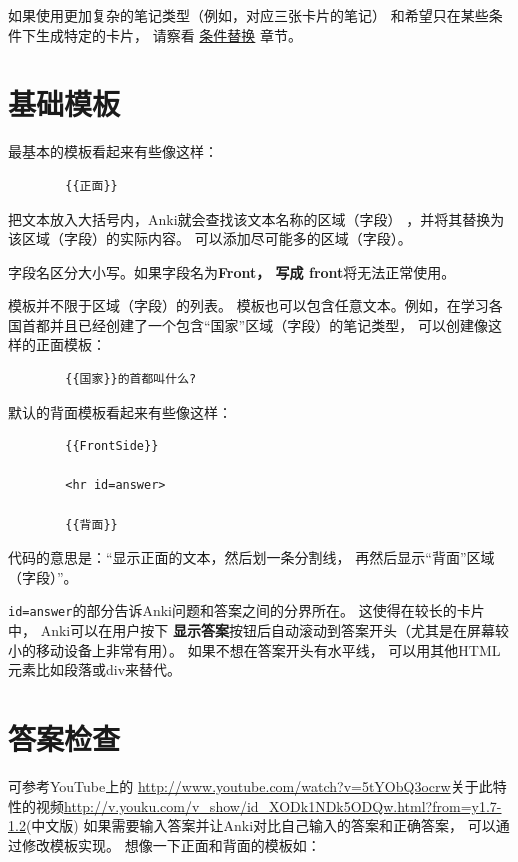 \documentclass[a4paper]{book}
\begin{document}
	如果使用更加复杂的笔记类型（例如，对应三张卡片的笔记） 和希望只在某些条件下生成特定的卡片， 请察看 \hyperref[conditionalreplacement]{条件替换} 章节。
	\section{基础模板}
	最基本的模板看起来有些像这样：
	
	\begin{shaded}\begin{verbatim}
		{{正面}}
		\end{verbatim}\end{shaded}
	
	把文本放入大括号内，Anki就会查找该文本名称的区域（字段） ，并将其替换为该区域（字段）的实际内容。 可以添加尽可能多的区域（字段）。
	
	\begin{shaded}
		字段名区分大小写。如果字段名为\textbf{Front， 写成 {{front}}}将无法正常使用。
	\end{shaded}
	
	模板并不限于区域（字段）的列表。 模板也可以包含任意文本。例如，在学习各国首都并且已经创建了一个包含“国家”区域（字段）的笔记类型， 可以创建像这样的正面模板：
	
	\begin{shaded}\begin{verbatim}
		{{国家}}的首都叫什么?
		\end{verbatim}\end{shaded}
	默认的背面模板看起来有些像这样：
	\begin{shaded}\begin{verbatim}
		{{FrontSide}}
		
		<hr id=answer>
		
		{{背面}}
		\end{verbatim}\end{shaded}
	代码的意思是：“显示正面的文本，然后划一条分割线， 再然后显示“背面”区域（字段）”。
	
	\verb|id=answer|的部分告诉Anki问题和答案之间的分界所在。 这使得在较长的卡片中， Anki可以在用户按下
	\textbf{显示答案}按钮后自动滚动到答案开头（尤其是在屏幕较小的移动设备上非常有用）。 如果不想在答案开头有水平线， 可以用其他HTML元素比如段落或div来替代。
	\section{答案检查}\label{typinganswers}
	可参考YouTube上的 \url{http://www.youtube.com/watch?v=5tYObQ3ocrw}关于此特性的视频\url{http://v.youku.com/v_show/id_XODk1NDk5ODQw.html?from=y1.7-1.2}(中文版)
	如果需要输入答案并让Anki对比自己输入的答案和正确答案， 可以通过修改模板实现。 想像一下正面和背面的模板如：
	
\end{document}
